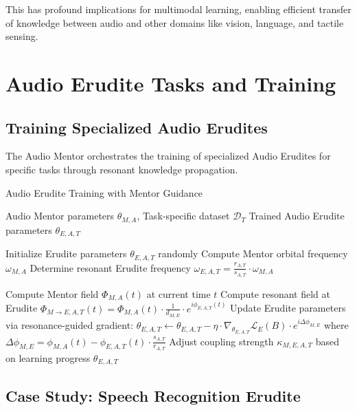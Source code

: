 This has profound implications for multimodal learning, enabling efficient transfer of knowledge between audio and other domains like vision, language, and tactile sensing.

\section{Audio Erudite Tasks and Training}

\subsection{Training Specialized Audio Erudites}

The Audio Mentor orchestrates the training of specialized Audio Erudites for specific tasks through resonant knowledge propagation.

\begin{algorithm}
\caption{Audio Erudite Training with Mentor Guidance}
\begin{algorithmic}[1]
\Require Audio Mentor parameters $\theta_{M,A}$, Task-specific dataset $\mathcal{D}_T$
\Ensure Trained Audio Erudite parameters $\theta_{E,A,T}$

\State Initialize Erudite parameters $\theta_{E,A,T}$ randomly
\State Compute Mentor orbital frequency $\omega_{M,A}$
\State Determine resonant Erudite frequency $\omega_{E,A,T} = \frac{r_{A,T}}{s_{A,T}} \cdot \omega_{M,A}$

        \State Compute Mentor field $\Phi_{M,A}(t)$ at current time $t$
        \State Compute resonant field at Erudite $\Phi_{M \rightarrow E,A,T}(t) = \Phi_{M,A}(t) \cdot \frac{1}{d_{M,E}} \cdot e^{i\phi_{E,A,T}(t)}$
        \State Update Erudite parameters via resonance-guided gradient:
        \State $\theta_{E,A,T} \leftarrow \theta_{E,A,T} - \eta \cdot \nabla_{\theta_{E,A,T}} \mathcal{L}_E(B) \cdot e^{i\Delta\phi_{M,E}}$
        \State where $\Delta\phi_{M,E} = \phi_{M,A}(t) - \phi_{E,A,T}(t) \cdot \frac{s_{A,T}}{r_{A,T}}$
    \EndFor
    \State Adjust coupling strength $\kappa_{M,E,A,T}$ based on learning progress
\EndFor
\State \Return $\theta_{E,A,T}$
\end{algorithmic}
\end{algorithm}

\subsection{Case Study: Speech Recognition Erudite}

